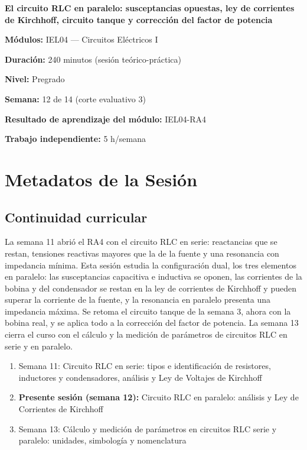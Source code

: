 \documentclass[11pt,letterpaper]{article}
\begin{document}
\begin{cabecera}
{\color{iubyellow}\Large\bfseries El circuito RLC en paralelo: susceptancias opuestas, ley de corrientes de Kirchhoff, circuito tanque y corrección del factor de potencia\par}
\vspace{0.6em}
\small
\textbf{\color{iubyellow}Módulos:} IEL04 --- Circuitos Eléctricos I\par
\textbf{\color{iubyellow}Duración:} 240 minutos (sesión teórico-práctica)\par
\textbf{\color{iubyellow}Nivel:} Pregrado\par
\textbf{\color{iubyellow}Semana:} 12 de 14 (corte evaluativo 3)\par
\textbf{\color{iubyellow}Resultado de aprendizaje del módulo:} IEL04-RA4\par
\textbf{\color{iubyellow}Trabajo independiente:} 5 h/semana\par
\end{cabecera}

\section{Metadatos de la Sesión}

\subsection{Continuidad curricular}

La semana 11 abrió el RA4 con el circuito RLC en serie: reactancias que se restan, tensiones reactivas mayores que la de la fuente y una resonancia con impedancia mínima. Esta sesión estudia la configuración dual, los tres elementos en paralelo: las susceptancias capacitiva e inductiva se oponen, las corrientes de la bobina y del condensador se restan en la ley de corrientes de Kirchhoff y pueden superar la corriente de la fuente, y la resonancia en paralelo presenta una impedancia máxima. Se retoma el circuito tanque de la semana 3, ahora con la bobina real, y se aplica todo a la corrección del factor de potencia. La semana 13 cierra el curso con el cálculo y la medición de parámetros de circuitos RLC en serie y en paralelo.

\begin{enumerate}
  \item Semana 11: Circuito RLC en serie: tipos e identificación de resistores, inductores y condensadores, análisis y Ley de Voltajes de Kirchhoff
  \item \textbf{Presente sesión (semana 12):} Circuito RLC en paralelo: análisis y Ley de Corrientes de Kirchhoff
  \item Semana 13: Cálculo y medición de parámetros en circuitos RLC serie y paralelo: unidades, simbología y nomenclatura
\end{enumerate}
\end{document}
